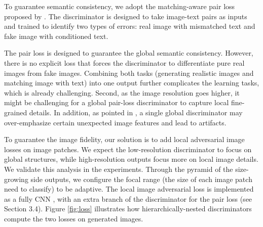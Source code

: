 \documentclass[10pt,twocolumn,letterpaper]{article}
\begin{document}
To guarantee semantic consistency, we adopt the matching-aware pair loss proposed by \cite{reed2016generative}. The discriminator is designed to take image-text pairs as inputs and trained to identify two types of errors: real image with mismatched text and fake image with conditioned text.

The pair loss is designed to guarantee the global semantic consistency. However, there is no explicit loss that forces the discriminator to differentiate pure real images from fake images. Combining both tasks (generating realistic images and matching image with text) into one output further complicates the learning tasks, which is already challenging.  Second, as the image resolution goes higher, it might be challenging for a global pair-loss discriminator to capture local fine-grained details.
In addition, as pointed in \cite{shrivastava2016learning}, a single global discriminator may over-emphasize certain unexpected image features and lead to artifacts. 

To guarantee the image fidelity, our solution is to add local adversarial image losses on image patches. 
%
We expect the low-resolution discriminator to focus on global structures, while high-resolution outputs focus more on local image details. We validate this analysis in the experiments. Through the pyramid of the size-growing side outputs, we configure the focal range (the size of each image patch need to classify) to be adaptive.
The local image adversarial loss is implemented as a fully CNN \cite{shrivastava2016learning,zhu2017unpaired},  with an extra branch of the discriminator for the pair loss (see Section 3.4).
Figure \ref{fig:loss} illustrates how hierarchically-nested discriminators compute the two losses on generated images. 
\end{document}
